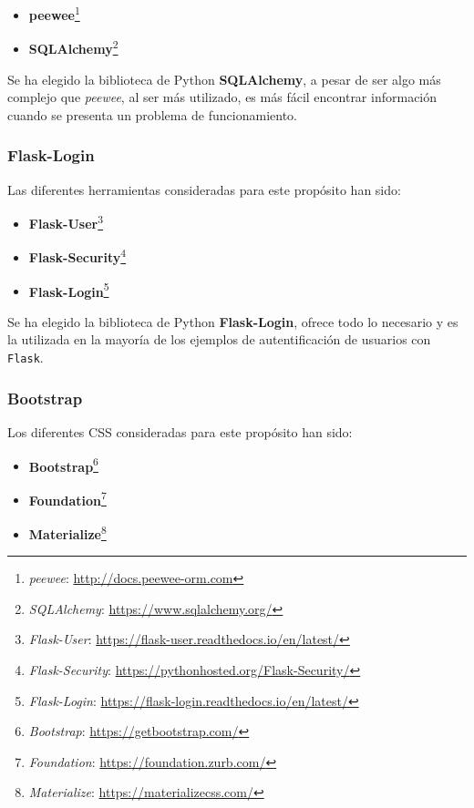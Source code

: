 \begin{itemize}
\item \textbf{peewee}\footnote{\textsl{peewee}: \url{http://docs.peewee-orm.com}}
\item \textbf{SQLAlchemy}\footnote{\textsl{SQLAlchemy}: \url{https://www.sqlalchemy.org/}}
\end{itemize}
Se ha elegido la biblioteca de Python \textbf{SQLAlchemy}, a pesar de ser algo más complejo que \emph{peewee}, al ser más utilizado, es más fácil encontrar información cuando se presenta un problema de funcionamiento.

\subsubsection{Flask-Login}
Las diferentes herramientas consideradas para este propósito han sido:

\begin{itemize}
\item \textbf{Flask-User}\footnote{\textsl{Flask-User}: \url{https://flask-user.readthedocs.io/en/latest/}}
\item \textbf{Flask-Security}\footnote{\textsl{Flask-Security}: \url{https://pythonhosted.org/Flask-Security/}}
\item \textbf{Flask-Login}\footnote{\textsl{Flask-Login}: \url{https://flask-login.readthedocs.io/en/latest/}}
\end{itemize}

Se ha elegido la biblioteca de Python \textbf{Flask-Login}, ofrece todo lo necesario y es la utilizada en la mayoría de los ejemplos de autentificación de usuarios con \texttt{Flask}.

\subsubsection{Bootstrap}
Los diferentes  CSS consideradas para este propósito han sido:

\begin{itemize}
\item \textbf{Bootstrap}\footnote{\textsl{Bootstrap}: \url{https://getbootstrap.com/}}
\item \textbf{Foundation}\footnote{\textsl{Foundation}: \url{https://foundation.zurb.com/}}
\item \textbf{Materialize}\footnote{\textsl{Materialize}: \url{https://materializecss.com/}}
\end{itemize}

